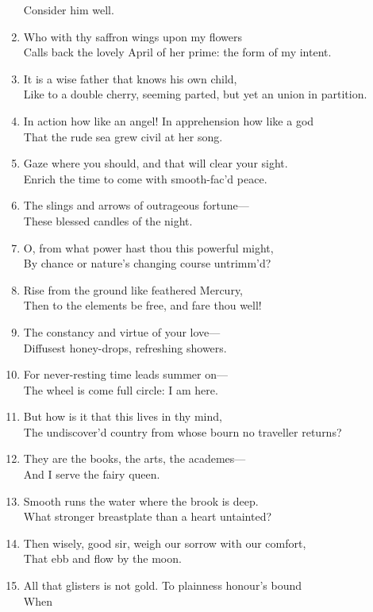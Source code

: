 \documentclass[17pt]{extarticle}
\begin{document}
\begin{enumerate}
  Consider him well.
\item
  Who with thy saffron wings upon my flowers\\Calls back the lovely
  April of her prime: the form of my intent.
\item
  It is a wise father that knows his own child,\\Like to a double
  cherry, seeming parted, but yet an union in partition.
\item
  In action how like an angel! In apprehension how like a god\\That the
  rude sea grew civil at her song.
\item
  Gaze where you should, and that will clear your sight.\\Enrich the
  time to come with smooth-fac'd peace.
\item
  The slings and arrows of outrageous fortune---\\These blessed candles
  of the night.
\item
  O, from what power hast thou this powerful might,\\By chance or
  nature's changing course untrimm'd?
\item
  Rise from the ground like feathered Mercury,\\Then to the elements be
  free, and fare thou well!
\item
  The constancy and virtue of your love---\\Diffusest honey-drops,
  refreshing showers.
\item
  For never-resting time leads summer on---\\The wheel is come full
  circle: I am here.
\item
  But how is it that this lives in thy mind,\\The undiscover'd country
  from whose bourn no traveller returns?
\item
  They are the books, the arts, the academes---\\And I serve the fairy
  queen.
\item
  Smooth runs the water where the brook is deep.\\What stronger
  breastplate than a heart untainted?
\item
  Then wisely, good sir, weigh our sorrow with our comfort,\\That ebb
  and flow by the moon.
\item
  All that glisters is not gold. To plainness honour's bound\\When

\end{enumerate}
\end{document}
